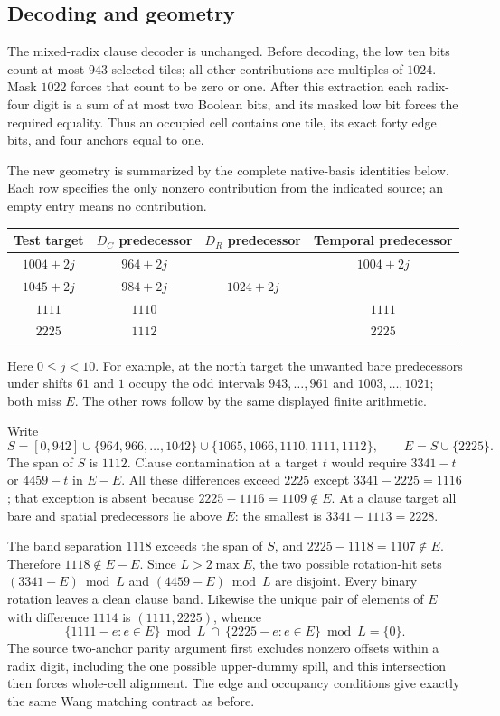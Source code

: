 \subsection{Decoding and geometry}

The mixed-radix clause decoder is unchanged.  Before decoding, the low ten
bits count at most $943$ selected tiles; all other contributions are multiples
of $1024$.  Mask $1022$ forces that count to be zero or one.  After this
extraction each radix-four digit is a sum of at most two Boolean bits, and
its masked low bit forces the required equality.  Thus an occupied cell
contains one tile, its exact forty edge bits, and four anchors equal to one.

The new geometry is summarized by the complete native-basis identities below.
Each row specifies the only nonzero contribution from the indicated source;
an empty entry means no contribution.
\begin{center}
\begin{tabular}{c|c|c|c}
Test target & $D_C$ predecessor & $D_R$ predecessor & Temporal predecessor\\
\hline
$1004+2j$ & $964+2j$ & & $1004+2j$\\
$1045+2j$ & $984+2j$ & $1024+2j$ &\\
$1111$ & $1110$ & & $1111$\\
$2225$ & $1112$ & & $2225$
\end{tabular}
\end{center}
Here $0\le j<10$.  For example, at the north target the unwanted bare
predecessors under shifts $61$ and $1$ occupy the odd intervals
$943,\ldots,961$ and $1003,\ldots,1021$; both miss $E$.  The other rows
follow by the same displayed finite arithmetic.

Write
\[
 S=[0,942]\cup\{964,966,\ldots,1042\}
   \cup\{1065,1066,1110,1111,1112\},\qquad E=S\cup\{2225\}.
\]
The span of $S$ is $1112$.  Clause contamination at a target $t$ would
require $3341-t$ or $4459-t$ in $E-E$.  All these differences exceed
$2225$ except $3341-2225=1116$; that exception is absent because
$2225-1116=1109\notin E$.  At a clause target all bare and spatial
predecessors lie above $E$: the smallest is $3341-1113=2228$.

The band separation $1118$ exceeds the span of $S$, and
$2225-1118=1107\notin E$.  Therefore $1118\notin E-E$.
Since $L>2\max E$, the two possible rotation-hit sets
$(3341-E)\bmod L$ and $(4459-E)\bmod L$ are disjoint.  Every binary
rotation leaves a clean clause band.  Likewise the unique pair of elements
of $E$ with difference $1114$ is $(1111,2225)$, whence
\[
 \{1111-e:e\in E\}\bmod L\ \cap\
 \{2225-e:e\in E\}\bmod L=\{0\}.
\]
The source two-anchor parity argument first excludes nonzero offsets within
a radix digit, including the one possible upper-dummy spill, and this
intersection then forces whole-cell alignment.  The edge and occupancy
conditions give exactly the same Wang matching contract as before.

